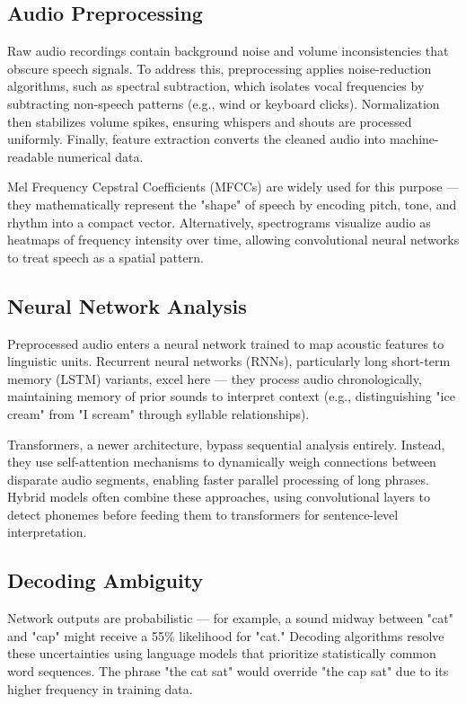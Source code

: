\subsection{Audio Preprocessing}
Raw audio recordings contain background noise and volume inconsistencies that obscure speech signals.
To address this, preprocessing applies noise-reduction algorithms, such as spectral subtraction,
which isolates vocal frequencies by subtracting non-speech patterns (e.g., wind or keyboard clicks).
Normalization then stabilizes volume spikes, ensuring whispers and shouts are processed uniformly.
Finally, feature extraction converts the cleaned audio into machine-readable numerical data.

Mel Frequency Cepstral Coefficients (MFCCs) are widely used for this purpose --- they mathematically represent
the "shape" of speech by encoding pitch, tone, and rhythm into a compact vector.
Alternatively, spectrograms visualize audio as heatmaps of frequency intensity over time,
allowing convolutional neural networks to treat speech as a spatial pattern.

\subsection{Neural Network Analysis}
Preprocessed audio enters a neural network trained to map acoustic features to linguistic units.
Recurrent neural networks (RNNs), particularly long short-term memory (LSTM) variants, excel here ---
they process audio chronologically, maintaining memory of prior sounds to interpret context
(e.g., distinguishing "ice cream" from "I scream" through syllable relationships).

Transformers, a newer architecture, bypass sequential analysis entirely.
Instead, they use self-attention mechanisms to dynamically weigh connections between
disparate audio segments, enabling faster parallel processing of long phrases.
Hybrid models often combine these approaches, using convolutional layers to detect phonemes
before feeding them to transformers for sentence-level interpretation.

\subsection{Decoding Ambiguity}
Network outputs are probabilistic --- for example, a sound midway between "cat" and "cap" might receive
a 55\% likelihood for "cat." Decoding algorithms resolve these uncertainties using language models
that prioritize statistically common word sequences. The phrase "the cat sat" would override
"the cap sat" due to its higher frequency in training data.

